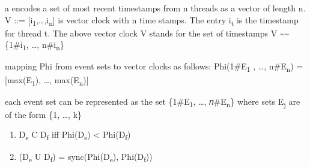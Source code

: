 \documentclass[landscape, a4paper]{article}
\begin{document}
\begin{minipage}[t]{0.195\linewidth}
	\raggedright

	\begin{betterlist}
		\item a  encodes a set of most recent timestamps from n threads as a vector of length n. V ::= [i\textsubscript{1},\ldots ,i\textsubscript{n}] is vector clock with n time stamps. The entry i\textsubscript{t} is the timestamp for thread t. The above vector clock V stands for the set of timestamps V  \sim\sim  \{1\#i\textsubscript{1}, \ldots, n\#i\textsubscript{n}\} %
		\begin{betterlist}
			\item mapping Phi from event sets to vector clocks as follows: Phi({1\#E\textsubscript{1} , \ldots, n\#E\textsubscript{n}}) = [max(E\textsubscript{1}), \ldots, max(E\textsubscript{n})]
			\begin{betterlist}
				\item each event set can be represented as the set \{1\#E\textsubscript{1}, \ldots, 𝑛\#E\textsubscript{n}\} where sets E\textsubscript{j} are of the form \{1, \ldots, k\}
			\end{betterlist}
			\item {}
			\begin{enumerate}
				\item D\textsubscript{e} C D\textsubscript{f} iff Phi(D\textsubscript{e}) < Phi(D\textsubscript{f})
				\item (D\textsubscript{e} U D\textsubscript{f}) = sync(Phi(D\textsubscript{e}), Phi(D\textsubscript{f}))
\end{enumerate}
\end{betterlist}
\end{betterlist}
\end{minipage}
\end{document}
